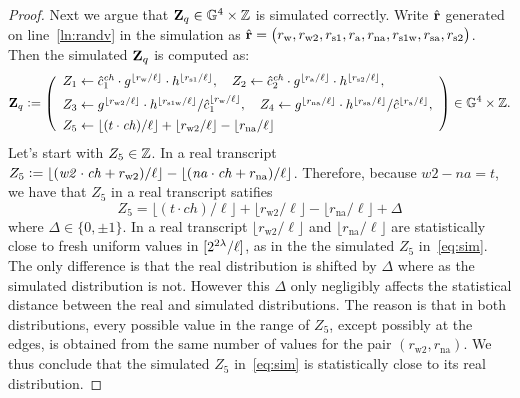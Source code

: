 \documentclass[11pt]{article}
\begin{document}
\begin{proof}
Next we argue that $\mathbf{Z}_q \in \mathbb G^4 \times \mathbb Z$ is simulated correctly. 
Write $\hat{\mathbf{r}}$ generated on line~\eqref{ln:randv} in the simulation
as $\hat{\mathbf{r}} = \big(r_\text{w}, r_\text{w2}, r_\text{s1}, r_\text{a}, r_\text{na}, r_\text{s1w}, r_\text{sa}, r_\text{s2} \big)$.
Then the simulated $\mathbf{Z}_q$ is computed as:
\begin{equation} \label{eq:sim}
\Zv_q \deq \left(\begin{array}{l}
Z_1 \gets \hat{c}_1^\mathit{ch} \cdot g^{\lfloor r_\text{w}/\ell \rfloor} \cdot h^{\lfloor r_\text{s1}/\ell \rfloor} ,\quad
Z_2 \gets \hat{c}_2^\mathit{ch} \cdot g^{\lfloor r_\text{a}/\ell \rfloor} \cdot h^{\lfloor r_\text{s2}/\ell \rfloor} , \AlgSep
Z_3 \gets g^{\lfloor r_\text{w2}/\ell \rfloor} \cdot h^{\lfloor r_\text{s1w}/\ell \rfloor} / \hat{c}_1^{\lfloor r_\text{w}/\ell \rfloor},\quad
Z_4 \gets g^{\lfloor r_\text{na}/\ell \rfloor} \cdot h^{\lfloor r_\text{sa}/\ell \rfloor} / \hat{c}^{\lfloor r_\text{a}/\ell \rfloor}, \AlgSep
Z_5 \gets \lfloor (t \cdot \mathit{ch})/\ell \rfloor + \lfloor r_\text{w2}/\ell \rfloor - \lfloor r_\text{na}/\ell \rfloor 
\end{array}\right) \in \GG^4 \times \ZZ.  
\end{equation}
Let's start with $Z_5 \in \mathbb Z$.  
In a real transcript 
$Z_5 \mathrel{\mathop:}= \lfloor (\mathit{w2} \cdot \mathit{ch} + r_\text{w2})/\ell \rfloor -
          \lfloor (\mathit{na} \cdot \mathit{ch} + r_\text{na})/\ell \rfloor$.
Therefore, because $\mathit{w2} - \mathit{na} = t$, we have
that $Z_5$ in a real transcript satifies
\[    Z_5 = \lfloor (t \cdot \mathit{ch})/\ell \rfloor + \lfloor r_\text{w2} / \ell \rfloor - \lfloor r_\text{na} / \ell \rfloor + \Delta \]
where $\Delta \in \{0, \pm 1\}$. 
In a real transcript $\lfloor r_\text{w2} / \ell \rfloor$ 
and $\lfloor r_\text{na} / \ell \rfloor$ 
are statistically close to fresh uniform values in $[{2^{2\lambda}/\ell}]$, 
as in the the simulated $Z_5$ in~\eqref{eq:sim}.
The only difference is that the real distribution is shifted by $\Delta$
where as the simulated distribution is not.  
However this $\Delta$ only negligibly affects the statistical distance
between the real and simulated distributions. 
The reason is that in both distributions, 
every possible value in the range of $Z_5$, 
except possibly at the edges, 
is obtained from the same number of values 
for the pair $(r_\text{w2}, r_\text{na})$. 
We thus conclude that the simulated $Z_5$ in~\eqref{eq:sim} 
is statistically close to its real distribution.


\end{proof}
\end{document}
